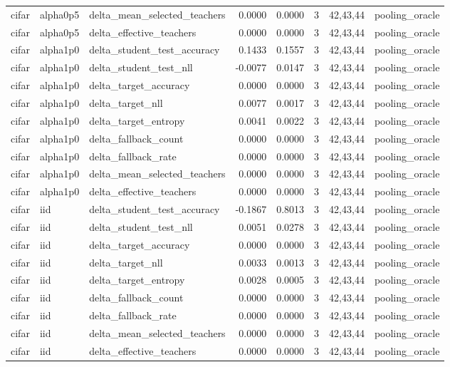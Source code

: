 \begin{tabular}{lllrrrll}
cifar & alpha0p5 & delta\_mean\_selected\_teachers & 0.0000 & 0.0000 & 3 & 42,43,44 & pooling\_oracle \\
cifar & alpha0p5 & delta\_effective\_teachers & 0.0000 & 0.0000 & 3 & 42,43,44 & pooling\_oracle \\
cifar & alpha1p0 & delta\_student\_test\_accuracy & 0.1433 & 0.1557 & 3 & 42,43,44 & pooling\_oracle \\
cifar & alpha1p0 & delta\_student\_test\_nll & -0.0077 & 0.0147 & 3 & 42,43,44 & pooling\_oracle \\
cifar & alpha1p0 & delta\_target\_accuracy & 0.0000 & 0.0000 & 3 & 42,43,44 & pooling\_oracle \\
cifar & alpha1p0 & delta\_target\_nll & 0.0077 & 0.0017 & 3 & 42,43,44 & pooling\_oracle \\
cifar & alpha1p0 & delta\_target\_entropy & 0.0041 & 0.0022 & 3 & 42,43,44 & pooling\_oracle \\
cifar & alpha1p0 & delta\_fallback\_count & 0.0000 & 0.0000 & 3 & 42,43,44 & pooling\_oracle \\
cifar & alpha1p0 & delta\_fallback\_rate & 0.0000 & 0.0000 & 3 & 42,43,44 & pooling\_oracle \\
cifar & alpha1p0 & delta\_mean\_selected\_teachers & 0.0000 & 0.0000 & 3 & 42,43,44 & pooling\_oracle \\
cifar & alpha1p0 & delta\_effective\_teachers & 0.0000 & 0.0000 & 3 & 42,43,44 & pooling\_oracle \\
cifar & iid & delta\_student\_test\_accuracy & -0.1867 & 0.8013 & 3 & 42,43,44 & pooling\_oracle \\
cifar & iid & delta\_student\_test\_nll & 0.0051 & 0.0278 & 3 & 42,43,44 & pooling\_oracle \\
cifar & iid & delta\_target\_accuracy & 0.0000 & 0.0000 & 3 & 42,43,44 & pooling\_oracle \\
cifar & iid & delta\_target\_nll & 0.0033 & 0.0013 & 3 & 42,43,44 & pooling\_oracle \\
cifar & iid & delta\_target\_entropy & 0.0028 & 0.0005 & 3 & 42,43,44 & pooling\_oracle \\
cifar & iid & delta\_fallback\_count & 0.0000 & 0.0000 & 3 & 42,43,44 & pooling\_oracle \\
cifar & iid & delta\_fallback\_rate & 0.0000 & 0.0000 & 3 & 42,43,44 & pooling\_oracle \\
cifar & iid & delta\_mean\_selected\_teachers & 0.0000 & 0.0000 & 3 & 42,43,44 & pooling\_oracle \\
cifar & iid & delta\_effective\_teachers & 0.0000 & 0.0000 & 3 & 42,43,44 & pooling\_oracle \\

\end{tabular}
